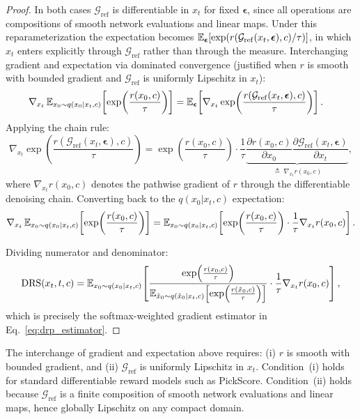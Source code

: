 \begin{proof}
In both cases $\mathcal{G}_{\mathrm{ref}}$ is differentiable in $x_t$ for fixed $\boldsymbol{\epsilon}$, since all operations are compositions of smooth network evaluations and linear maps. Under this reparameterization the expectation becomes $\mathbb{E}_{\boldsymbol{\epsilon}}[\exp(r(\mathcal{G}_{\mathrm{ref}}(x_t,\boldsymbol{\epsilon}),c)/\tau)]$, in which $x_t$ enters explicitly through $\mathcal{G}_{\mathrm{ref}}$ rather than through the measure. Interchanging gradient and expectation via dominated convergence (justified when $r$ is smooth with bounded gradient and $\mathcal{G}_{\mathrm{ref}}$ is uniformly Lipschitz in $x_t$):
\begin{align}
\nabla_{x_t}\,\mathbb{E}_{x_0\sim q(x_0|x_t,c)}\!\left[\exp\!\left(\frac{r(x_0,c)}{\tau}\right)\right]
&= \mathbb{E}_{\boldsymbol{\epsilon}}\!\left[\nabla_{x_t}\exp\!\left(\frac{r(\mathcal{G}_{\mathrm{ref}}(x_t,\boldsymbol{\epsilon}),c)}{\tau}\right)\right].
\end{align}
Applying the chain rule:
\begin{equation}
\nabla_{x_t}\exp\!\left(\frac{r(\mathcal{G}_{\mathrm{ref}}(x_t,\boldsymbol{\epsilon}),c)}{\tau}\right)
= \exp\!\left(\frac{r(x_0,c)}{\tau}\right)\cdot\frac{1}{\tau}\underbrace{\frac{\partial r(x_0,c)}{\partial x_0}\frac{\partial\mathcal{G}_{\mathrm{ref}}(x_t,\boldsymbol{\epsilon})}{\partial x_t}}_{\triangleq\;\nabla_{x_t}r(x_0,c)},
\end{equation}
where $\nabla_{x_t}r(x_0,c)$ denotes the pathwise gradient of $r$ through the differentiable denoising chain. Converting back to the $q(x_0|x_t,c)$ expectation:
\begin{equation}
\nabla_{x_t}\,\mathbb{E}_{x_0\sim q(x_0|x_t,c)}\!\left[\exp\!\left(\frac{r(x_0,c)}{\tau}\right)\right]
= \mathbb{E}_{x_0\sim q(x_0|x_t,c)}\!\left[\exp\!\left(\frac{r(x_0,c)}{\tau}\right)\cdot\frac{1}{\tau}\nabla_{x_t}r(x_0,c)\right].
\end{equation}

Dividing numerator and denominator:
\begin{equation}
\mathrm{DRS}(x_t,t,c)
= \mathbb{E}_{x_0\sim q(x_0|x_t,c)}\!\left[
\frac{\exp\!\left(\tfrac{r(x_0,c)}{\tau}\right)}
{\mathbb{E}_{\tilde x_0\sim q(\tilde x_0|x_t,c)}\!\left[\exp\!\left(\tfrac{r(\tilde x_0,c)}{\tau}\right)\right]}
\cdot\frac{1}{\tau}\nabla_{x_t}r(x_0,c)
\right],
\end{equation}
which is precisely the softmax-weighted gradient estimator in Eq.~\eqref{eq:drp_estimator}.
\end{proof}

\begin{remark}
The interchange of gradient and expectation above requires: (i) $r$ is smooth with bounded gradient, and (ii) $\mathcal{G}_{\mathrm{ref}}$ is uniformly Lipschitz in $x_t$. Condition~(i) holds for standard differentiable reward models such as PickScore. Condition~(ii) holds because $\mathcal{G}_{\mathrm{ref}}$ is a finite composition of smooth network evaluations and linear maps, hence globally Lipschitz on any compact domain.
\end{remark}

